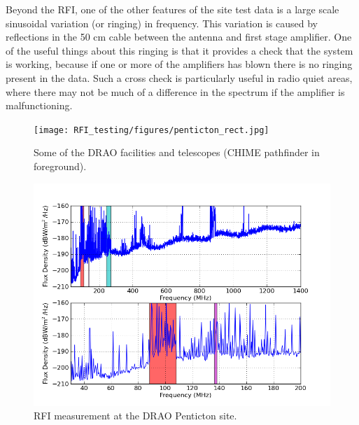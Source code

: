 Beyond the RFI, one of the other features of the site test data is a large scale sinusoidal variation (or ringing) in frequency. This variation is caused by reflections in the 50 cm cable between the antenna and first stage amplifier. One of the useful things about this ringing is that it provides a check that the system is working, because if one or more of the amplifiers has blown there is no ringing present in the data. Such a cross check is particularly useful in radio quiet areas, where there may not be much of a difference in the spectrum if the amplifier is malfunctioning. 

\begin{figure}[htb]
\begin{center}
\texttt{[image: RFI\_testing/figures/penticton\_rect.jpg]}
\caption{Some of the DRAO facilities and telescopes (CHIME pathfinder in foreground). }
\label{Fig:penticton}
\end{center}
\end{figure}

\begin{figure}[htb]
\begin{center}
\includegraphics[width=0.9\linewidth]{RFI_testing/figures/DRAO_bands.png}
\caption{RFI measurement at the DRAO Penticton site. }
\label{Fig:draorfi}
\end{center}
\end{figure}

